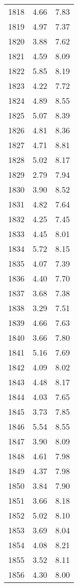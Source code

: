 \begin{tabular}{lrr}
1818 &    4.66 &    7.83 \\
1819 &    4.97 &    7.37 \\
1820 &    3.88 &    7.62 \\
1821 &    4.59 &    8.09 \\
1822 &    5.85 &    8.19 \\
1823 &    4.22 &    7.72 \\
1824 &    4.89 &    8.55 \\
1825 &    5.07 &    8.39 \\
1826 &    4.81 &    8.36 \\
1827 &    4.71 &    8.81 \\
1828 &    5.02 &    8.17 \\
1829 &    2.79 &    7.94 \\
1830 &    3.90 &    8.52 \\
1831 &    4.82 &    7.64 \\
1832 &    4.25 &    7.45 \\
1833 &    4.45 &    8.01 \\
1834 &    5.72 &    8.15 \\
1835 &    4.07 &    7.39 \\
1836 &    4.40 &    7.70 \\
1837 &    3.68 &    7.38 \\
1838 &    3.29 &    7.51 \\
1839 &    4.66 &    7.63 \\
1840 &    3.66 &    7.80 \\
1841 &    5.16 &    7.69 \\
1842 &    4.09 &    8.02 \\
1843 &    4.48 &    8.17 \\
1844 &    4.03 &    7.65 \\
1845 &    3.73 &    7.85 \\
1846 &    5.54 &    8.55 \\
1847 &    3.90 &    8.09 \\
1848 &    4.61 &    7.98 \\
1849 &    4.37 &    7.98 \\
1850 &    3.84 &    7.90 \\
1851 &    3.66 &    8.18 \\
1852 &    5.02 &    8.10 \\
1853 &    3.69 &    8.04 \\
1854 &    4.08 &    8.21 \\
1855 &    3.52 &    8.11 \\
1856 &    4.30 &    8.00 \\

\end{tabular}
